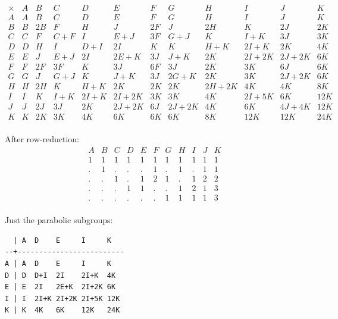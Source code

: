 \documentclass[11pt,oneside]{article}
\newcommand{\thinplus}{\!+\!}
\begin{document}
{\small
$$
\begin{array}{r|rrrrrrrrrrr}
\times & A & B & C & D & E & F & G & H & I & J & K \\
\hline
A & A & B & C & D & E & F & G & H & I & J & K \\
B & B & 2B & F & H & J & 2F & J & 2H & K & 2J & 2K \\
C & C & F & C\thinplus F & I & E\thinplus J & 3F & G\thinplus J & K & I\thinplus K & 3J & 3K \\
D & D & H & I & D\thinplus I & 2I & K & K & H\thinplus K & 2I\thinplus K & 2K & 4K \\
E & E & J & E\thinplus J & 2I & 2E\thinplus K & 3J & J\thinplus K & 2K & 2I\thinplus 2K & 2J\thinplus 2K & 6K \\
F & F & 2F & 3F & K & 3J & 6F & 3J & 2K & 3K & 6J & 6K \\
G & G & J & G\thinplus J & K & J\thinplus K & 3J & 2G\thinplus K & 2K & 3K & 2J\thinplus 2K & 6K \\
H & H & 2H & K & H\thinplus K & 2K & 2K & 2K & 2H\thinplus 2K & 4K & 4K & 8K \\
I & I & K & I\thinplus K & 2I\thinplus K & 2I\thinplus 2K & 3K & 3K & 4K & 2I\thinplus 5K & 6K & 12K \\
J & J & 2J & 3J & 2K & 2J\thinplus 2K & 6J & 2J\thinplus 2K & 4K & 6K & 4J\thinplus 4K & 12K \\
K & K & 2K & 3K & 4K & 6K & 6K & 6K & 8K & 12K & 12K & 24K \\
\end{array}
$$
}

After row-reduction:
$$
\begin{array}{rrrrrrrrrrr}
 A & B & C & D & E & F & G & H & I & J & K \\
\hline
1 & 1 & 1 & 1 & 1 & 1 & 1 & 1 & 1 & 1 & 1 \\
. & 1 & . & . & . & 1 & . & 1 & . & 1 & 1 \\
. & . & 1 & . & 1 & 2 & 1 & . & 1 & 2 & 2 \\
. & . & . & 1 & 1 & . & . & 1 & 2 & 1 & 3 \\
. & . & . & . & . & . & 1 & 1 & 1 & 1 & 3 \\
\end{array}
$$


Just the parabolic subgroups:

\begin{verbatim}
  | A  D    E     I     K    
--+-------------------------
A | A  D    E     I     K    
D | D  D+I  2I    2I+K  4K   
E | E  2I   2E+K  2I+2K 6K   
I | I  2I+K 2I+2K 2I+5K 12K  
K | K  4K   6K    12K   24K  
\end{verbatim}
\end{document}
